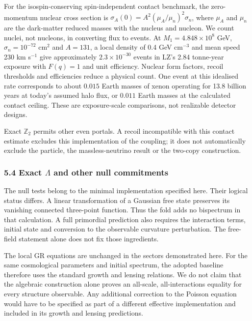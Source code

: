 \documentclass[
]{article}
\begin{document}
For the isospin-conserving spin-independent contact benchmark, the
zero-momentum nuclear cross section is
\(\sigma_A(0)=A^2(\mu_A/\mu_n)^2\sigma_n\), where \(\mu_A\) and
\(\mu_n\) are the dark-matter reduced masses with the nucleus and
nucleon. We count nuclei, not nucleons, in converting flux to events. At
\(M_1=4.848\times10^8\) GeV, \(\sigma_n=10^{-72}\) cm\(^2\) and
\(A=131\), a local density of 0.4 GeV cm\(^{-3}\) and mean speed 230 km
s\(^{-1}\) give approximately \(2.3\times10^{-30}\) events in LZ's 2.84
tonne-year exposure with \(F(q)=1\) and unit efficiency. Nuclear form
factors, recoil thresholds and efficiencies reduce a physical count. One
event at this idealised rate corresponds to about \(0.015\) Earth masses
of xenon operating for 13.8 billion years at today's assumed halo flux,
or \(0.011\) Earth masses at the calculated contact ceiling. These are
exposure-scale comparisons, not realizable detector designs.

Exact \(\mathbb Z_2\) permits other even portals. A recoil incompatible
with this contact estimate excludes this implementation of the coupling;
it does not automatically exclude the particle, the massless-neutrino
result or the two-copy construction.

\subsubsection{\texorpdfstring{5.4 Exact \(\Lambda\) and other null
commitments}{5.4 Exact \textbackslash Lambda and other null commitments}}\label{exact-lambda-and-other-null-commitments}

The null tests belong to the minimal implementation specified here.
Their logical status differs. A linear transformation of a Gaussian free
state preserves its vanishing connected three-point function. Thus the
fold adds no bispectrum in that calculation. A full primordial
prediction also requires the interaction terms, initial state and
conversion to the observable curvature perturbation. The free-field
statement alone does not fix those ingredients.

The local GR equations are unchanged in the sectors demonstrated here.
For the same cosmological parameters and initial spectrum, the adopted
baseline therefore uses the standard growth and lensing relations. We do
not claim that the algebraic construction alone proves an all-scale,
all-interactions equality for every structure observable. Any additional
correction to the Poisson equation would have to be specified as part of
a different effective implementation and included in its growth and
lensing predictions.
\end{document}
